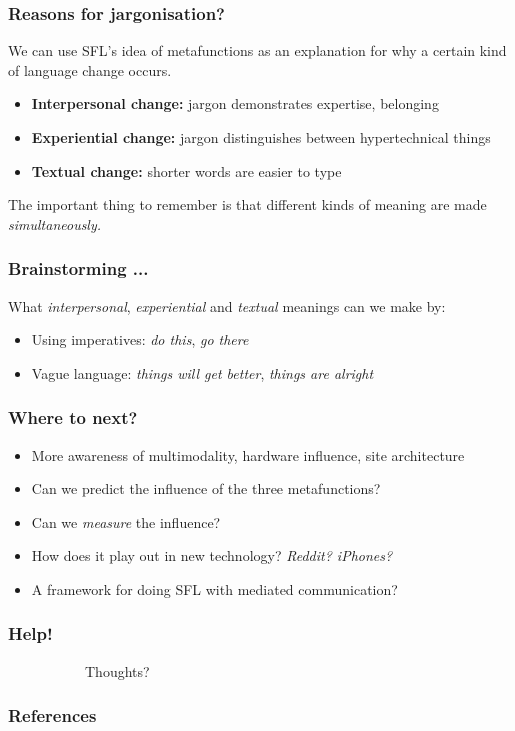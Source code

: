 \documentclass{beamer}       %
\begin{document}
\begin{frame}
	\frametitle{Reasons for jargonisation?}

	We can use SFL's idea of metafunctions as an explanation for why a certain kind of language change occurs.
	
	\begin{itemize}
	\item \textbf{Interpersonal change:} jargon demonstrates expertise, belonging
	\item \textbf{Experiential change:} jargon distinguishes between hypertechnical things
	\item \textbf{Textual change:} shorter words are easier to type
	\end{itemize}

	The important thing to remember is that different kinds of meaning are made \emph{simultaneously.}
\end{frame}


\begin{frame}
	\frametitle{Brainstorming ...}

	What \emph{interpersonal}, \emph{experiential} and \emph{textual} meanings can we make by:
	
	\begin{itemize}
	\item Using imperatives: \emph{do this}, \emph{go there}
	\item Vague language: \emph{things will get better}, \emph{things are alright}
	\end{itemize}
\end{frame}


\begin{frame}
	\frametitle{Where to next?}
	\begin{itemize}
	\item More awareness of multimodality, hardware influence, site architecture
	\item Can we predict the influence of the three metafunctions?
	\item Can we \emph{measure} the influence?
	\item How does it play out in new technology? \emph{Reddit? iPhones?}
	\item A framework for doing SFL with mediated communication?
	\end{itemize}
\end{frame}


\begin{frame}
	\frametitle{Help!}
	
	~~~~~~~~~~~Thoughts?

\end{frame}







\begin{frame}[t,allowframebreaks]
\frametitle{References}


\end{frame}
\end{document}
